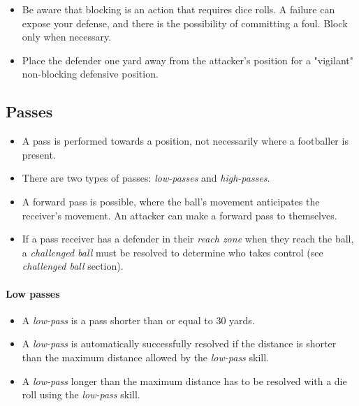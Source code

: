 \documentclass[12pt]{article}
\begin{document}
\begin{hint}
\begin{itemize}
\item Be aware that blocking is an action that requires dice rolls. A failure can expose your defense, and there is the possibility of committing a foul. Block only when necessary.
\item Place the defender one yard away from the attacker's position for a "vigilant" non-blocking defensive position.
\end{itemize}
\end{hint}

\subsection{Passes}

\begin{rulebox}
\begin{itemize}
\item A pass is performed towards a position, not necessarily where a footballer is present.
\item There are two types of passes: \emph{low-passes} and \emph{high-passes}.
\end{itemize}
\end{rulebox}

\begin{note}
\begin{itemize}
\item A forward pass is possible, where the ball's movement anticipates the receiver's movement. An attacker can make a forward pass to themselves.
\item If a pass receiver has a defender in their \emph{reach zone} when they reach the ball, a \emph{challenged ball }must be resolved to determine who takes control (see \emph{challenged ball }section).
\end{itemize}
\end{note}

\paragraph{Low passes}

\begin{rulebox}
\begin{itemize}
\item A \emph{low-pass} is a pass shorter than or equal to 30 yards.
\item A \emph{low-pass} is automatically successfully resolved if the distance is shorter than the maximum distance allowed by the \emph{low-pass} skill.
\item A \emph{low-pass} longer than the maximum distance has to be resolved with a die roll using the \emph{low-pass} skill.
\end{itemize}
\end{rulebox}
\end{document}
